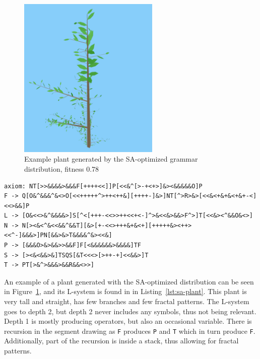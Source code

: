 \begin{figure}
    \centering
    \includegraphics[width=0.6\textwidth]{figures/sa-plant}
    \caption[Example plant generated by the SA-optimized grammar distribution]{Example plant generated by the \gls{SA}-optimized grammar distribution, fitness 0.78}
    \label{fig:sa-plant}
\end{figure}

\begin{lstlisting}[caption=L-system representation of plant in Figure~\ref{fig:sa-plant}, label=lst:sa-plant, float]
axiom: NT[>>&&&&>&&&F[++++<<]]P[<<&^[>-+<+>]&><&&&&&O]P
F -> Q[O&^&&&^&<>O[<<+++++^>++<++&][++++-]&>]NT[^>R>&>[<<&<+&+&<+&+-<]<<>&&]P
L -> [O&<<>&^&&&&>]S[^<[+++-<<>>++<<+<-]^>&<<&>&&>F^>]T[<<&><^&&O&<>]
N -> N[><&<^&<<&&^&&T][&>[+-<<>+++&+&<+][+++++&><++><<^-]&&&>]PN[&&>&>T&&&&^&><<&]
P -> [&&&O>&>&&>>&&F]F[<&&&&&&>&&&&]TF
S -> [><&<&&>&]TSQS[&T<<<>[>++-+]<<&&>]T
T -> PT[>&^>&&&>&&R&&<>>]
\end{lstlisting}

An example of a plant generated with the \gls{SA}-optimized distribution can be seen in Figure~\ref{fig:sa-plant}, and its \gls{L-system} is found in in Listing~\ref{lst:sa-plant}.
This plant is very tall and straight, has few branches and few fractal patterns.
The \gls{L-system} goes to depth 2, but depth 2 never includes any symbols, thus not being relevant.
Depth 1 is mostly producing operators, but also an occasional variable.
There is recursion in the segment drawing as \texttt{F} produces \texttt{P} and \texttt{T} which in turn produce \texttt{F}.
Additionally, part of the recursion is inside a stack, thus allowing for fractal patterns.

